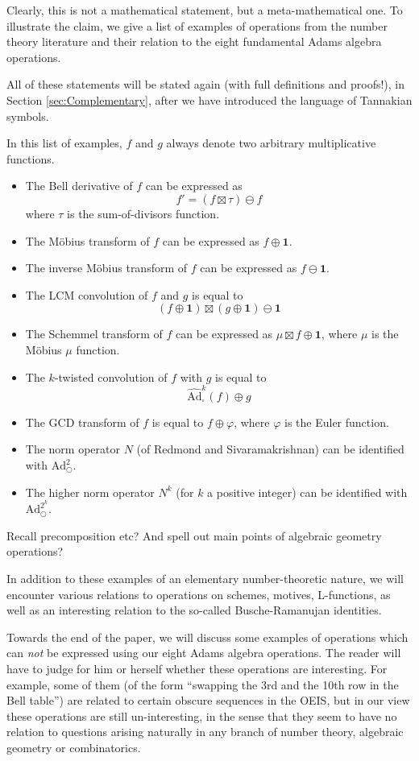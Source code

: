 \documentclass[a4paper]{article}
\theoremstyle{definition}
\theoremstyle{remark}
\newcommand{\one}{\mathbf{1}}
\newcommand{\adam}[1]{\text{Ad}^{#1}_{\bigcirc}}
\newcommand{\hatboxadam}[1]{\widehat{\text{Ad}}^{#1}_{\square}}
\begin{document}
Clearly, this is not a mathematical statement, but a meta-mathematical one. To illustrate the claim, we give a list of examples of operations from the number theory literature and their relation to the eight fundamental Adams algebra operations. 

All of these statements will be stated again (with full definitions and proofs!), in Section \ref{sec:Complementary}, after we have introduced the language of Tannakian symbols.

In this list of examples, $f$ and $g$ always denote two arbitrary multiplicative functions.
\begin{itemize}
\item The Bell derivative of $f$ can be expressed as
$$   f' = (f \boxtimes \tau) \ominus  f  $$  
where $\tau$ is the sum-of-divisors function.
\item The M{\"o}bius transform of $f$ can be expressed as $f \oplus \one$.
\item The inverse M{\"o}bius transform of $f$ can be expressed as $f \ominus \one$.
\item The LCM convolution of $f$ and $g$ is equal to 
$$ (f \oplus \one) \boxtimes (g \oplus \one) \ominus \one    $$
\item The Schemmel transform of $f$ can be expressed as $\mu \boxtimes f \oplus \one$, where $\mu$ is the M{\"o}bius $\mu$ function.
\item The $k$-twisted convolution of $f$ with $g$ is equal to 
$$    \hatboxadam{k}(f) \oplus g   $$
\item The GCD transform of $f$ is equal to $f \oplus \varphi$, where $\varphi$ is the Euler function.
\item The norm operator $N$ (of Redmond and Sivaramakrishnan) can be identified with $\adam{2}$.
\item The higher norm operator $N^k$ (for $k$ a positive integer) can be identified with $\adam{2^k}$.
\end{itemize}

Recall precomposition etc? And spell out main points of algebraic geometry operations?

In addition to these examples of an elementary number-theoretic nature, we will encounter various relations to operations on schemes, motives, L-functions, as well as an interesting relation to the so-called Busche-Ramanujan identities. 

Towards the end of the paper, we will discuss some examples of operations which can \emph{not} be expressed using our eight Adams algebra operations. The reader will have to judge for him or herself whether these operations are interesting. For example, some of them (of the form ``swapping the 3rd and the 10th row in the Bell table'') are related to certain obscure sequences in the OEIS, but in our view these operations are still un-interesting, in the sense that they seem to have no relation to questions arising naturally in any branch of number theory, algebraic geometry or combinatorics. 
\end{document}

